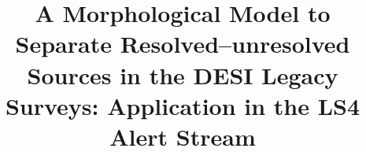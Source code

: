 \documentclass[twocolumn]{aastex631}
\begin{document}
\begin{CJK*}{UTF8}{gbsn}
\title{A Morphological Model to Separate Resolved--unresolved Sources in the DESI Legacy Surveys: Application in the LS4 Alert Stream}




\end{CJK*}
\end{document}
